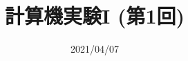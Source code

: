 \documentclass[10pt,dvipdfmx]{beamer}
\title{計算機実験I (第1回)}
\date{2021/04/07}
\begin{document}
\begin{frame}
  \titlepage
  \tableofcontents
\end{frame}




%
%

%
%
\end{document}
